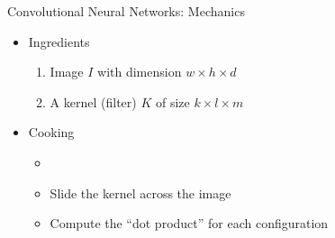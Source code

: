 \begin{slide}{Convolutional Neural Networks: Mechanics}
  \begin{itemize}
    \item<2-> Ingredients
    \begin{enumerate}
      \item<3-> Image $I$ with dimension $w \times h \times d$
      \item<4-> A kernel (filter) $K$ of size $k \times l \times m$
    \end{enumerate}
    \item<5-> Cooking
    \begin{itemize}
      \item<6-> 
      \item<8-> Slide the kernel across the image
      \item<9-> Compute the ``dot product'' for each configuration
    \end{itemize}
  \end{itemize}
\end{slide}


